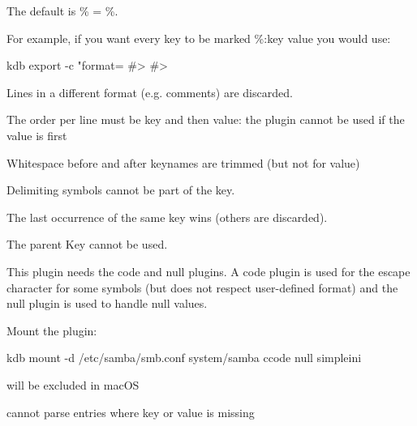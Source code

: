 The default is {\ttfamily \% = \%}.

For example, if you want every key to be marked {\ttfamily \%\+:key value} you would use\+:


\begin{DoxyCode}
kdb export -c "format=%
#> %
#> %
\end{DoxyCode}



\begin{DoxyItemize}
\item Lines in a different format (e.\+g. comments) are discarded.
\item The order per line must be key and then value\+: the plugin cannot be used if the value is first
\item Whitespace before and after keynames are trimmed (but not for value)
\item Delimiting symbols cannot be part of the key.
\item The last occurrence of the same key wins (others are discarded).
\item The parent Key cannot be used.
\item This plugin needs the code and null plugins. A code plugin is used for the escape character for some symbols (but does not respect user-\/defined {\ttfamily format}) and the null plugin is used to handle null values.
\end{DoxyItemize}

Mount the plugin\+:


\begin{DoxyCode}
kdb mount -d /etc/samba/smb.conf system/samba ccode null simpleini
\end{DoxyCode}



\begin{DoxyItemize}
\item will be excluded in mac\+OS
\item cannot parse entries where key or value is missing 
\end{DoxyItemize}